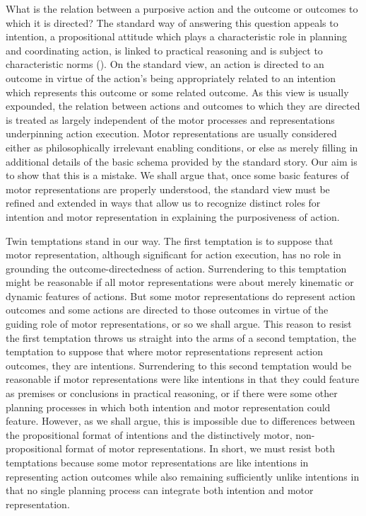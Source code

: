 \documentclass[12pt,\papersize]{extarticle}
\begin{document}
What is the relation between a purposive action and the outcome or outcomes to which it is directed? The standard way of answering this question appeals to intention, a propositional attitude which plays a characteristic role in planning and coordinating action, is linked to practical reasoning and is subject to characteristic norms (\citealp{Bratman:1987xw}).  On the standard view, an action is directed to an outcome in virtue of the action's being appropriately related to an intention which represents this outcome or some related outcome. As this view is usually expounded, the relation between actions and outcomes to which they are directed is treated as largely independent of the motor processes and representations underpinning action execution. Motor representations are usually considered either as philosophically irrelevant enabling conditions, or else as merely filling in additional details of the basic schema provided by the standard story. Our aim is to show that this is a mistake. We shall argue that, once some basic features of motor representations are properly understood, the standard view must be  refined and extended in ways that allow us to recognize distinct roles for intention and motor representation in explaining the purposiveness of action.

Twin temptations stand in our way. The first temptation is to suppose that motor representation, although significant  for action execution, has no role in grounding the outcome-directedness of action. Surrendering to this temptation might be reasonable if all motor representations were about merely kinematic or dynamic features of actions. But some motor representations do represent action outcomes and some actions are directed to those outcomes in virtue of the guiding role of motor representations, or so we shall argue. This reason to resist the first temptation throws us straight into the arms of a second temptation, the temptation to suppose that where motor representations represent action outcomes, they are intentions. Surrendering to this second temptation would be reasonable if motor representations were like intentions in that they could feature as premises or conclusions in practical reasoning, or if there were some other planning processes in which both intention and motor representation could feature. However, as we shall argue, this is impossible due to differences between the propositional format of intentions and the distinctively motor, non-propositional format of motor representations.  In short, we must resist both temptations because some motor representations are like intentions in representing action outcomes while also remaining sufficiently unlike intentions in that no single planning process can integrate both intention and motor representation.  
\end{document}
